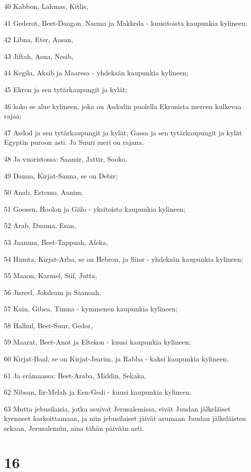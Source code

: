 \par 40 Kabbon, Lahmas, Kitlis,
\par 41 Gederot, Beet-Daagon, Naema ja Makkeda - kuusitoista kaupunkia kylineen;
\par 42 Libna, Eter, Aasan,
\par 43 Jiftah, Asna, Nesib,
\par 44 Kegila, Aksib ja Maaresa - yhdeksän kaupunkia kylineen;
\par 45 Ekron ja sen tytärkaupungit ja kylät;
\par 46 koko se alue kylineen, joka on Asdodin puolella Ekronista mereen kulkevaa rajaa;
\par 47 Asdod ja sen tytärkaupungit ja kylät; Gassa ja sen tytärkaupungit ja kylät Egyptin puroon asti. Ja Suuri meri on rajana.
\par 48 Ja vuoristossa: Saamir, Jattir, Sooko,
\par 49 Danna, Kirjat-Sanna, se on Debir;
\par 50 Anab, Estemo, Aanim;
\par 51 Goosen, Hoolon ja Giilo - yksitoista kaupunkia kylineen;
\par 52 Arab, Duuma, Esan,
\par 53 Jaanum, Beet-Tappuah, Afeka,
\par 54 Humta, Kirjat-Arba, se on Hebron, ja Siior - yhdeksän kaupunkia kylineen;
\par 55 Maaon, Karmel, Siif, Jutta,
\par 56 Jisreel, Jokdeam ja Saanoah,
\par 57 Kain, Gibea, Timna - kymmenen kaupunkia kylineen;
\par 58 Halhul, Beet-Suur, Gedor,
\par 59 Maarat, Beet-Anot ja Eltekon - kuusi kaupunkia kylineen;
\par 60 Kirjat-Baal, se on Kirjat-Jearim, ja Rabba - kaksi kaupunkia kylineen.
\par 61 Ja erämaassa: Beet-Araba, Middin, Sekaka,
\par 62 Nibsan, Iir-Melah ja Een-Gedi - kuusi kaupunkia kylineen.
\par 63 Mutta jebusilaisia, jotka asuivat Jerusalemissa, eivät Juudan jälkeläiset kyenneet karkoittamaan, ja niin jebusilaiset jäivät asumaan Juudan jälkeläisten sekaan, Jerusalemiin, aina tähän päivään asti.

\chapter{16}

